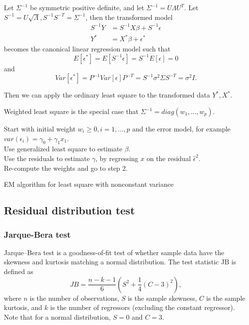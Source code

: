 \begin{refsection}
\begin{note}
	Let $\Sigma^{-1}$ be symmetric positive definite, and let $\Sigma^{-1} = U\Lambda U^T$. Let $S^{-1} = U\sqrt{\Lambda}, S^{-1}S^{-T}=\Sigma^{-1}$, then the transformed model
	\begin{align*}
	S^{-1}Y &= S^{-1}X\beta + S^{-1}\epsilon \\
	Y^* &= X^*\beta + \epsilon^*
	\end{align*}
	becomes the canonical linear regression model such that
	$$E[\epsilon^*] = E[S^{-1}\epsilon] = S^{-1}E[\epsilon] = 0$$
	and
	$$Var[\epsilon^*] = P^{-1}Var[\epsilon]P^{-T} = S^{-1}\sigma^2 \Sigma S^{-T} = \sigma^2 I.$$
	
	Then we can apply the ordinary least square to the transformed data $Y^*,X^*$.
\end{note}


\begin{remark}
	Weighted least square is the special case that $\Sigma^{-1}=diag(w_1,...,w_p)$.
\end{remark}



\begin{algorithm}[H]
	\SetAlgoLined
	Start with initial weight $w_i\geq 0,i=1,...,p$ and the error model, for example $var(\epsilon_i) = \gamma_0 + \gamma_1x_1$.\\
	Use generalized least square to estimate $\beta$.\\
	Use the residuals to estimate $\gamma$, by regressing $x$ on the residual $\hat{\epsilon}^2$.\\
	Re-compute the weights and go to step 2.\\
	\caption{EM algorithm for least square with nonconstant variance}
\end{algorithm}

\subsection{Residual distribution test}

\subsubsection{Jarque-Bera test}

\begin{definition}
Jarque–Bera test is a goodness-of-fit test of whether sample data have the skewness and kurtosis matching a normal distribution. The test statistic JB is defined as
	$$JB = \frac{n-k-1}{6}(S^2 + \frac{1}{4}(C-3)^2),$$
where $n$ is the number of observations, $S$ is the sample skewness, $C$ is the sample kurtosis, and $k$ is the number of regressors (excluding the constant regressor). Note that for a normal distribution, $S = 0$ and $C = 3$. 	
\end{definition}


\end{refsection}
